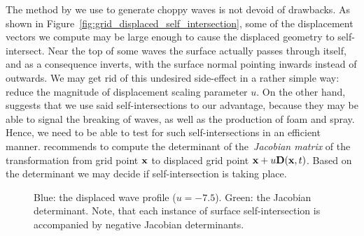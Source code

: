 %
The method by \citet{course:simulatingocean} we use to generate 
choppy waves is not devoid of drawbacks.
As shown in Figure~\ref{fig:grid_displaced_self_intersection}, some of the
displacement vectors we compute may be large enough to cause the displaced
geometry to self-intersect. Near the top of some 
waves the surface actually passes through itself, and as a consequence inverts, 
with the surface normal pointing inwards instead of outwards. We may get rid of 
this undesired side-effect in a rather simple way: reduce the magnitude of 
displacement scaling parameter $u$.
On the other hand, \citeauthor{course:simulatingocean} suggests that we use
said self-intersections to our advantage, because they may be able to signal
the breaking of waves, as well as the production of foam and spray. Hence, we
need to be able to test for such self-intersections in an efficient manner.
\citeauthor{course:simulatingocean} recommends to 
compute the determinant of the~\emph{Jacobian matrix} of the transformation 
from grid point $\mathbf{x}$ to displaced grid point 
$\mathbf{x}+u\mathbf{D}(\mathbf{x},t)$. Based on the determinant we may decide if 
self-intersection is taking place.
%
%
\begin{figure}
\centering
{}
\caption{Blue: the displaced wave profile ($u = -7.5$). Green: the Jacobian 
determinant. Note, that each instance of surface self-intersection is 
accompanied by negative Jacobian determinants.}
\label{fig:grid_displaced_j}
\end{figure}
